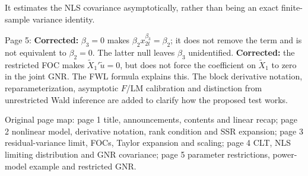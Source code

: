 \documentclass[11pt]{article}
\begin{document}
\begin{transcriptnotes}
       It estimates the NLS covariance asymptotically, rather than being an
       exact finite-sample variance identity.
 \item Page 5: \textbf{Corrected:} $\beta_{3}=0$ makes
       $\beta_{2}x_{2t}^{\beta_{3}}=\beta_{2}$; it does not remove the term and
       is not equivalent to $\beta_{2}=0$. The latter null leaves $\beta_{3}$
       unidentified. \textbf{Corrected:} the restricted FOC makes
       $\tilde X_{1}'\tilde u=0$, but does not force the coefficient on
       $\tilde X_{1}$ to zero in the joint GNR. The FWL formula explains this.
       The block derivative notation, reparameterization, asymptotic $F$/LM
       calibration and distinction from unrestricted Wald inference are added
       to clarify how the proposed test works.
 \item Original page map: page 1 title, announcements, contents and linear
       recap; page 2 nonlinear model, derivative notation, rank condition and
       SSR expansion; page 3 residual-variance limit, FOCs, Taylor expansion
       and scaling; page 4 CLT, NLS limiting distribution and GNR covariance;
       page 5 parameter restrictions, power-model example and restricted GNR.
\end{transcriptnotes}
\end{document}
